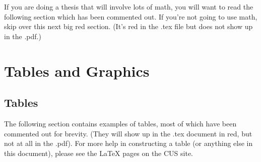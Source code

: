 \documentclass[12pt,twoside]{reedthesis}
\theoremstyle{plain}   %
\theoremstyle{definition}
\theoremstyle{remark}
\numberwithin{equation}{section}
\begin{document}
	If you are doing a thesis that will involve lots of math, you will want to read the following section which has been commented out. If you're not going to use math, skip over this next big red section. (It's red in the .tex file but does not show up in the .pdf.)

\chapter{Tables and Graphics}

\section{Tables}
	The following section contains examples of tables, most of which have been commented out for brevity. (They will show up in the .tex document in red, but not at all in the .pdf). For more help in constructing a table (or anything else in this document), please see the LaTeX pages on the CUS site. 
\end{document}
